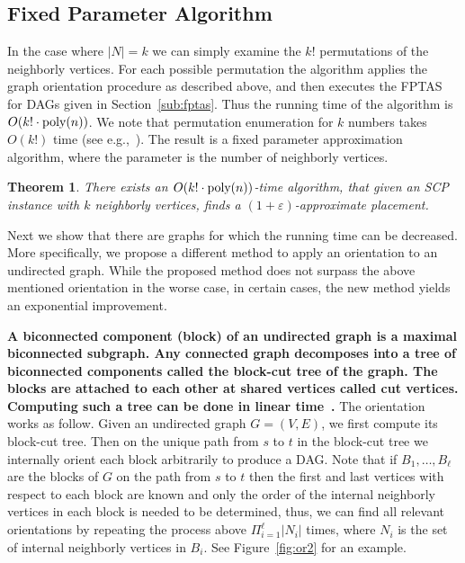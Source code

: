 \documentclass[11pt]{article}
\newcommand{\fix}[1]{{\color{purple}\textbf{#1}}}
\newtheorem{theorem}{Theorem}
\newcommand{\abs}[1]{\left| #1 \right|}
\newcommand{\eps}{\varepsilon}
\newcommand{\scp}{\textsc{SCP}\xspace}
\begin{document}

\subsection{Fixed Parameter Algorithm}

In the case where $\abs{N} = k$ we can simply examine the $k!$
permutations of the neighborly vertices.  For each possible
permutation the algorithm applies the graph orientation procedure as
described above, and then executes the FPTAS for DAGs given in
Section~\ref{sub:fptas}.  
Thus the running time of the algorithm is $O(k! \cdot \text{\rm poly}(n))$.
%
We note that permutation enumeration for $k$ numbers takes $O(k!)$
time (see e.g.,~\cite{Even73,Sedgewick77}).
%
The result is a fixed parameter approximation algorithm, where the
parameter is the number of neighborly vertices.

\begin{theorem}
There exists an $O(k! \cdot \text{\rm poly}(n))$-time algorithm, that
given an \scp instance with $k$ neighborly vertices, finds a
$(1+\eps)$-approximate placement.
\end{theorem}

Next we show that there are graphs for which the running time can be
decreased.  More specifically, we propose a different method to apply
an orientation to an undirected graph.  While the proposed method does
not surpass the above mentioned orientation in the worse case, in
certain cases, the new method yields an exponential improvement.

\fix{
A biconnected component (block) of an undirected graph is a maximal biconnected subgraph.
Any connected graph decomposes into a tree of biconnected components called the block-cut tree of the graph. The blocks are attached to each other at shared vertices called cut vertices.
Computing such a tree can be done in linear time~\cite{HopcroftTarjan73}.
}
The orientation works as follow.  
Given an undirected graph $G = (V,E)$, we first compute its block-cut tree.
%
Then on the unique path from $s$ to $t$ in the block-cut tree we
internally orient each block arbitrarily to produce a DAG.  Note that
if $B_1, \ldots, B_\ell$ are the blocks of $G$ on the path from $s$ to
$t$ then the first and last vertices with respect to each block are
known and only the order of the internal neighborly vertices in each
block is needed to be determined, thus, we can find all relevant
orientations by repeating the process above $\Pi_{i = 1}^\ell
\abs{N_i}$ times, where $N_i$ is the set of internal neighborly
vertices in $B_i$.  See Figure~\ref{fig:or2} for an example.
\end{document}
